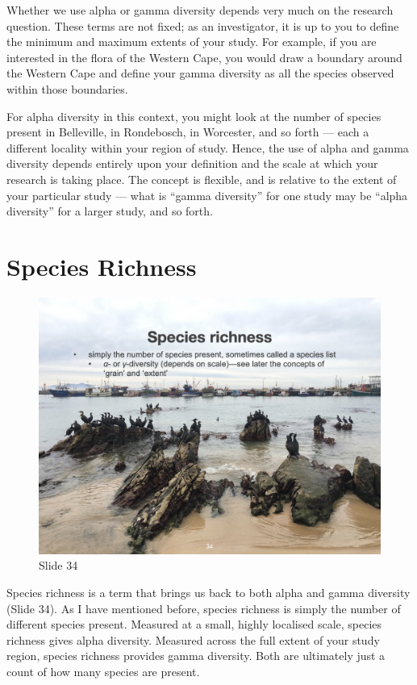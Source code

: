 \documentclass[
  11pt,
]{book}
\begin{document}
Whether we use alpha or gamma diversity depends very much on the
research question. These terms are not fixed; as an investigator, it is
up to you to define the minimum and maximum extents of your study. For
example, if you are interested in the flora of the Western Cape, you
would draw a boundary around the Western Cape and define your gamma
diversity as all the species observed within those boundaries.

For alpha diversity in this context, you might look at the number of
species present in Belleville, in Rondebosch, in Worcester, and so forth
--- each a different locality within your region of study. Hence, the
use of alpha and gamma diversity depends entirely upon your definition
and the scale at which your research is taking place. The concept is
flexible, and is relative to the extent of your particular study ---
what is ``gamma diversity'' for one study may be ``alpha diversity'' for
a larger study, and so forth.

\section{Species Richness}\label{species-richness}

\begin{figure}[ht]
\centering
\includegraphics[width=0.8\linewidth]{../images/BDC334/BDC334-034.jpeg}
\caption*{Slide 34}
\end{figure}

Species richness is a term that brings us back to both alpha and gamma
diversity (Slide 34). As I have mentioned before, species richness is
simply the number of different species present. Measured at a small,
highly localised scale, species richness gives alpha diversity. Measured
across the full extent of your study region, species richness provides
gamma diversity. Both are ultimately just a count of how many species
are present.
\end{document}

